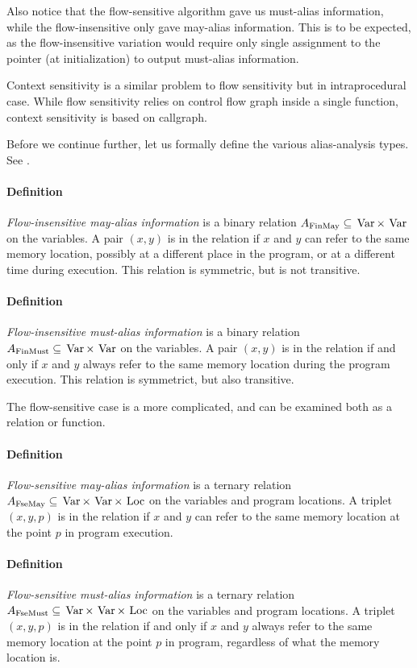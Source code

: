 Also notice that the flow-sensitive algorithm gave us must-alias
information, while the flow-insensitive only gave may-alias information.
This is to be expected, as the flow-insensitive variation would require only
single assignment to the pointer (at initialization) to output must-alias
information.

Context sensitivity is a similar problem to flow sensitivity but in
intraprocedural case. While flow sensitivity relies on control flow graph inside
a single function, context sensitivity is based on callgraph. 

Before we continue further, let us formally define the various alias-analysis
types. See \cite{muchnick1997advanced}.

\paragraph{Definition} {\it Flow-insensitive may-alias information} is a binary
relation $A_{\mathrm{FinMay}} \subseteq \operatorname*{\,Var} \times \operatorname*{\,Var} $ on the variables. A pair
$(x,y)$ is in the relation if $x$ and $y$ can refer to the same
memory location, possibly at a different place in the program, or at a different
time during execution. This relation is symmetric, but is not transitive.

\paragraph{Definition} {\it Flow-insensitive must-alias information} is a binary
relation $A_{\mathrm{FinMust}} \subseteq \operatorname*{\,Var} \times \operatorname*{\,Var}$ on the variables. A pair
$(x,y)$ is in the relation if and only if $x$ and $y$ always refer to the same
memory location during the program execution. This relation is symmetrict, but
also transitive. 

The flow-sensitive case is a more complicated, and can be examined both as a
relation or function.

\paragraph{Definition} {\it Flow-sensitive may-alias information} is a ternary
relation $A_{\mathrm{FseMay}} \subseteq \operatorname*{\,Var} \times \operatorname*{\,Var} \times \operatorname*{\,Loc}$ on the variables
and program locations. A triplet $(x,y,p)$ is in the relation if $x$
and $y$ can refer to the same memory location at the point $p$ in program
execution.

\paragraph{Definition} {\it Flow-sensitive must-alias information} is a ternary
relation $A_{\mathrm{FseMust}} \subseteq \operatorname*{\,Var} \times \operatorname*{\,Var} \times \operatorname*{\,Loc}$ on the variables
and program locations. A triplet $(x,y,p)$ is in the relation if and only if $x$
and $y$ always refer to the same memory location at the point $p$ in program,
regardless of what the memory location is.

